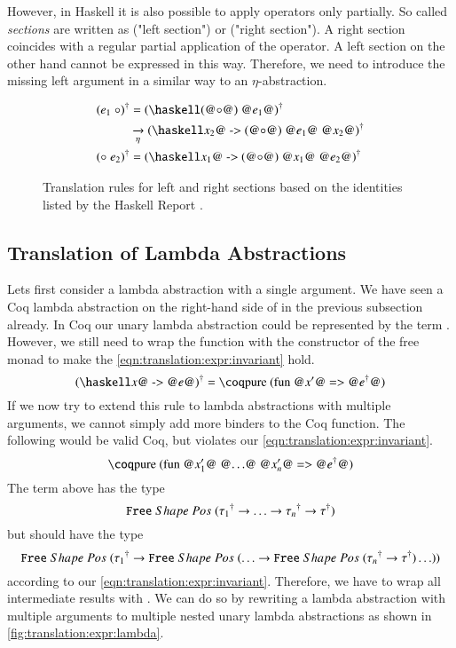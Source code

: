 However, in Haskell it is also possible to apply operators only partially.
So called \textit{sections} are written as  ("left section") or  ("right section").
A right section coincides with a regular partial application of the operator.
A left section on the other hand cannot be expressed in this way.
Therefore, we need to introduce the missing left argument in a similar way to an $\eta$-abstraction.
\begin{figure}[H]
  \begin{align*}
    \toCoq{(e_1\;\circ)}
      &= \toCoq{(\haskellM{(@$\circ$@) @$e_1$@})}                                        \\
      &\xrightarrow[\eta]{} \toCoq{(\haskellM{\@$x_2$@ -> (@$\circ$@) @$e_1$@ @$x_2$@})} \\
    \toCoq{(\circ\;e_2)}
      &= \toCoq{(\haskellM{\@$x_1$@ -> (@$\circ$@) @$x_1$@ @$e_2$@})}
  \end{align*}
  \caption{
    Translation rules for left and right sections based on the identities listed by the Haskell Report \cite[p.~19]{Marlow:2010}.
  }
  \label{fig:translation:expr:sections}
\end{figure}

\subsection{Translation of Lambda Abstractions} \label{sec:translation:expr:lambda}
Lets first consider a lambda abstraction  with a single argument.
We have seen a Coq lambda abstraction on the right-hand side of \coq{>>=} in the previous subsection already.
In Coq our unary lambda abstraction could be represented by the term .
However, we still need to wrap the function with the  constructor of the free monad to make the \ref{eqn:translation:expr:invariant} hold.
\[
  \toCoq{(\haskellM{\@$x$@ -> @$e$@})} = \coqM{pure (fun @$x'$@ => @$\toCoqX{e}$@)}
\]
If we now try to extend this rule to lambda abstractions  with multiple arguments, we cannot simply add more binders to the Coq function.
The following would be valid Coq, but violates our \ref{eqn:translation:expr:invariant}.
\[
  \coqM{pure (fun @$x_1'$@ @$\ldots$@ @$x_n'$@ => @$\toCoqX{e}$@)}
\]
The term above has the type
\[
  {\texttt{Free}}\;Shape\;Pos\;{({\tau_1}^{\dagger}
    \rightarrow \ldots
    \rightarrow {\tau_n}^{\dagger}
    \rightarrow {\tau}^{\dagger})}
\]
but should have the type
\[
  {\texttt{Free}}\;Shape\;Pos\;{({\tau_1}^{\dagger}
    \rightarrow {\texttt{Free}}\;Shape\;Pos\;{(\ldots
    \rightarrow {\texttt{Free}}\;Shape\;Pos\;{({\tau_n}^{\dagger}
    \rightarrow {\tau}^{\dagger})} \ldots)})}
\]
according to our \ref{eqn:translation:expr:invariant}.
Therefore, we have to wrap all intermediate results with .
We can do so by rewriting a lambda abstraction with multiple arguments to multiple nested unary lambda abstractions as shown in \autoref{fig:translation:expr:lambda}.

